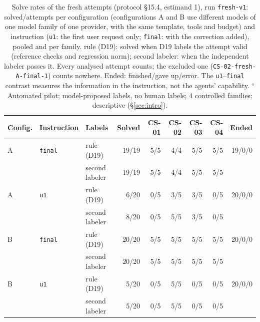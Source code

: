 \begin{table}[t]\centering\footnotesize
\caption{Solve rates of the fresh attempts (protocol \S15.4, estimand 1), run \texttt{fresh-v1}: solved/attempts per configuration (configurations A and B use different models of one model family of one provider, with the same template, tools and budget) and instruction (\texttt{u1}: the first user request only; \texttt{final}: with the correction added), pooled and per family. rule (D19): solved when D19 labels the attempt valid (reference checks and regression norm); second labeler: when the independent labeler passes it. Every analysed attempt counts; the excluded one (\texttt{CS-02-fresh-A-final-1}) counts nowhere. Ended: finished/gave up/error. The \texttt{u1}--\texttt{final} contrast measures the information in the instruction, not the agents' capability. $^{\diamond}$Automated pilot; model-proposed labels, no human labels; 4 controlled families; descriptive (\S\ref{sec:intro}).}\label{tab:fresh-solve}
\begin{tabular}{lllrrrrrr}\toprule Config. & Instruction & Labels & Solved & CS-01 & CS-02 & CS-03 & CS-04 & Ended \\\midrule
A & \texttt{final} & rule (D19) & 19/19 & 5/5 & 4/4 & 5/5 & 5/5 & 19/0/0 \\
 & & second labeler & 19/19 & 5/5 & 4/4 & 5/5 & 5/5 & \\\addlinespace
A & \texttt{u1} & rule (D19) & 6/20 & 0/5 & 3/5 & 3/5 & 0/5 & 20/0/0 \\
 & & second labeler & 8/20 & 0/5 & 5/5 & 3/5 & 0/5 & \\\addlinespace
B & \texttt{final} & rule (D19) & 20/20 & 5/5 & 5/5 & 5/5 & 5/5 & 20/0/0 \\
 & & second labeler & 20/20 & 5/5 & 5/5 & 5/5 & 5/5 & \\\addlinespace
B & \texttt{u1} & rule (D19) & 5/20 & 0/5 & 5/5 & 0/5 & 0/5 & 20/0/0 \\
 & & second labeler & 5/20 & 0/5 & 5/5 & 0/5 & 0/5 & \\
\bottomrule\end{tabular}\end{table}
